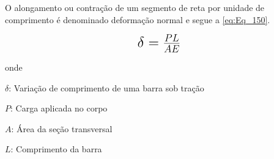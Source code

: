 O alongamento ou contração de um segmento de reta por unidade de comprimento é denominado deformação normal e segue a \autoref{eq:Eq_150}.

\begin{equation}\label{eq:Eq_150}%
\mbox{\fontsize{17.28}{21.6}\selectfont\( %
\delta = \frac{PL}{AE}
\)} %
\end{equation}

onde

$\delta$: Variação de comprimento de uma barra sob tração

$P$: Carga aplicada no corpo

$A$: Área da seção transversal

$L$: Comprimento da barra

\hfill


